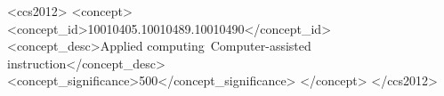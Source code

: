 \documentclass[acmsmall,screen]{acmart}
\begin{document}


\begin{CCSXML}
<ccs2012>
   <concept>
       <concept_id>10010405.10010489.10010490</concept_id>
       <concept_desc>Applied computing~Computer-assisted instruction</concept_desc>
       <concept_significance>500</concept_significance>
       </concept>
 </ccs2012>
\end{CCSXML}




\maketitle























\appendix

\
\end{document}
